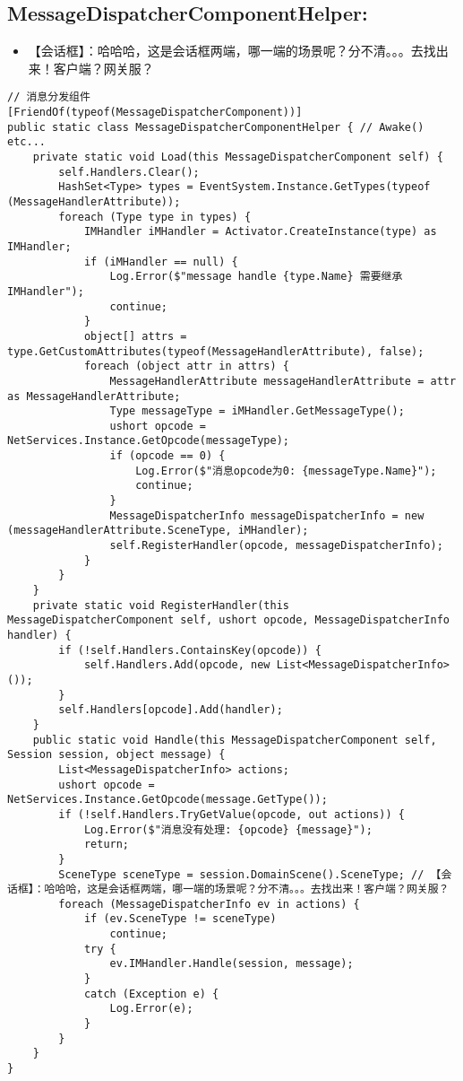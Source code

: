 \documentclass[9pt, b5paper]{article}
\begin{document}
\subsection{MessageDispatcherComponentHelper:}
\label{sec-1-8}
\begin{itemize}
\item 【会话框】：哈哈哈，这是会话框两端，哪一端的场景呢？分不清。。。去找出来！客户端？网关服？
\end{itemize}
\begin{verbatim}
// 消息分发组件
[FriendOf(typeof(MessageDispatcherComponent))]
public static class MessageDispatcherComponentHelper { // Awake() etc...
    private static void Load(this MessageDispatcherComponent self) {
        self.Handlers.Clear();
        HashSet<Type> types = EventSystem.Instance.GetTypes(typeof (MessageHandlerAttribute));
        foreach (Type type in types) {
            IMHandler iMHandler = Activator.CreateInstance(type) as IMHandler;
            if (iMHandler == null) {
                Log.Error($"message handle {type.Name} 需要继承 IMHandler");
                continue;
            }
            object[] attrs = type.GetCustomAttributes(typeof(MessageHandlerAttribute), false);
            foreach (object attr in attrs) {
                MessageHandlerAttribute messageHandlerAttribute = attr as MessageHandlerAttribute;
                Type messageType = iMHandler.GetMessageType();
                ushort opcode = NetServices.Instance.GetOpcode(messageType);
                if (opcode == 0) {
                    Log.Error($"消息opcode为0: {messageType.Name}");
                    continue;
                }
                MessageDispatcherInfo messageDispatcherInfo = new (messageHandlerAttribute.SceneType, iMHandler);
                self.RegisterHandler(opcode, messageDispatcherInfo);
            }
        }
    }
    private static void RegisterHandler(this MessageDispatcherComponent self, ushort opcode, MessageDispatcherInfo handler) {
        if (!self.Handlers.ContainsKey(opcode)) {
            self.Handlers.Add(opcode, new List<MessageDispatcherInfo>());
        }
        self.Handlers[opcode].Add(handler);
    }
    public static void Handle(this MessageDispatcherComponent self, Session session, object message) {
        List<MessageDispatcherInfo> actions;
        ushort opcode = NetServices.Instance.GetOpcode(message.GetType());
        if (!self.Handlers.TryGetValue(opcode, out actions)) {
            Log.Error($"消息没有处理: {opcode} {message}");
            return;
        }
        SceneType sceneType = session.DomainScene().SceneType; // 【会话框】：哈哈哈，这是会话框两端，哪一端的场景呢？分不清。。。去找出来！客户端？网关服？
        foreach (MessageDispatcherInfo ev in actions) {
            if (ev.SceneType != sceneType) 
                continue;
            try {
                ev.IMHandler.Handle(session, message);
            }
            catch (Exception e) {
                Log.Error(e);
            }
        }
    }
}
\end{verbatim}
\end{document}
